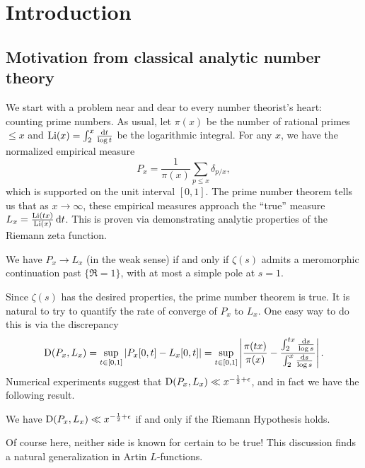 
\chapter{Introduction}





\section{Motivation from classical analytic number theory}

We start with a problem near and dear to every number theorist's heart: 
counting prime numbers. As usual, let $\pi(x)$ be the number of rational 
primes $\leqslant x$ and $\operatorname{Li}(x) = \int_2^x \frac{\mathrm{d} t}{\log t}$ be the 
logarithmic integral. For any $x$, we have the normalized empirical measure 
\[
	P_x = \frac{1}{\pi(x)} \sum_{p\leqslant x} \delta_{p/x} ,
\]
which is supported on the unit interval $[0,1]$. The prime number theorem 
tells us that as $x\to \infty$, these empirical measures approach the 
``true'' measure $L_x = \frac{\operatorname{Li}(t x)}{\operatorname{Li}(x)}\, \mathrm{d} t$. This is proven via 
demonstrating analytic properties of the Riemann zeta function. 

\begin{theorem}
We have $P_x \to L_x$ (in the weak sense) if and only if $\zeta(s)$ admits 
a meromorphic continuation past $\{\Re =1\}$, with at most a simple pole at 
$s=1$. 
\end{theorem}

Since $\zeta(s)$ has the desired properties, the prime number theorem is true. 
It is natural to try to quantify the rate of converge of $P_x$ to $L_x$. One 
easy way to do this is via the discrepancy 
\[
	\operatorname{D}(P_x,L_x) 
		= \sup_{t\in [0,1]} \left| P_x[0,t] - L_x[0,t]\right|
		= \sup_{t\in [0,1]} \left| \frac{\pi(t x)}{\pi(x)} - \frac{\int_2^{tx} \frac{\mathrm{d} s}{\log s}}{\int_2^x \frac{\mathrm{d} s}{\log s}}\right| .
\]
Numerical experiments suggest that 
$\operatorname{D}(P_x,L_x) \ll x^{-\frac 1 2+\epsilon}$, and in fact we have the following 
result. 

\begin{theorem}
We have $\operatorname{D}(P_x,L_x) \ll x^{-\frac 1 2+\epsilon}$ if and only if the 
Riemann Hypothesis holds. 
\end{theorem}

Of course here, neither side is known for certain to be true! This discussion 
finds a natural generalization in Artin $L$-functions. 

